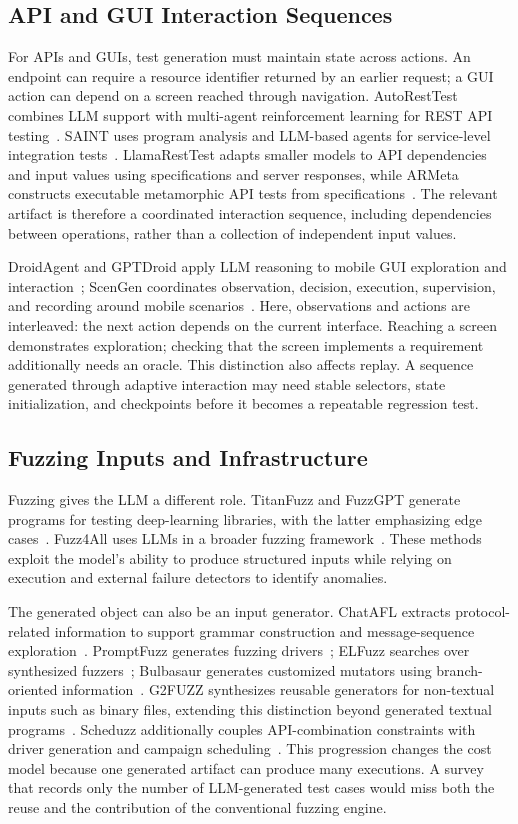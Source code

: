 \subsection{API and GUI Interaction Sequences}
For APIs and GUIs, test generation must maintain state across actions. An endpoint can require a resource identifier returned by an earlier request; a GUI action can depend on a screen reached through navigation. AutoRestTest combines LLM support with multi-agent reinforcement learning for REST API testing~\cite{A01}. SAINT uses program analysis and LLM-based agents for service-level integration tests~\cite{A02}. LlamaRestTest adapts smaller models to API dependencies and input values using specifications and server responses, while ARMeta constructs executable metamorphic API tests from specifications~\cite{A05,A06}. The relevant artifact is therefore a coordinated interaction sequence, including dependencies between operations, rather than a collection of independent input values.

DroidAgent and GPTDroid apply LLM reasoning to mobile GUI exploration and interaction~\cite{A03,A04}; ScenGen coordinates observation, decision, execution, supervision, and recording around mobile scenarios~\cite{A07}. Here, observations and actions are interleaved: the next action depends on the current interface. Reaching a screen demonstrates exploration; checking that the screen implements a requirement additionally needs an oracle. This distinction also affects replay. A sequence generated through adaptive interaction may need stable selectors, state initialization, and checkpoints before it becomes a repeatable regression test.

\subsection{Fuzzing Inputs and Infrastructure}
Fuzzing gives the LLM a different role. TitanFuzz and FuzzGPT generate programs for testing deep-learning libraries, with the latter emphasizing edge cases~\cite{F01,F02}. Fuzz4All uses LLMs in a broader fuzzing framework~\cite{F03}. These methods exploit the model's ability to produce structured inputs while relying on execution and external failure detectors to identify anomalies.

The generated object can also be an input generator. ChatAFL extracts protocol-related information to support grammar construction and message-sequence exploration~\cite{F04}. PromptFuzz generates fuzzing drivers~\cite{F05}; ELFuzz searches over synthesized fuzzers~\cite{F06}; Bulbasaur generates customized mutators using branch-oriented information~\cite{F07}. G2FUZZ synthesizes reusable generators for non-textual inputs such as binary files, extending this distinction beyond generated textual programs~\cite{F08}. Scheduzz additionally couples API-combination constraints with driver generation and campaign scheduling~\cite{F10}. This progression changes the cost model because one generated artifact can produce many executions. A survey that records only the number of LLM-generated test cases would miss both the reuse and the contribution of the conventional fuzzing engine.

